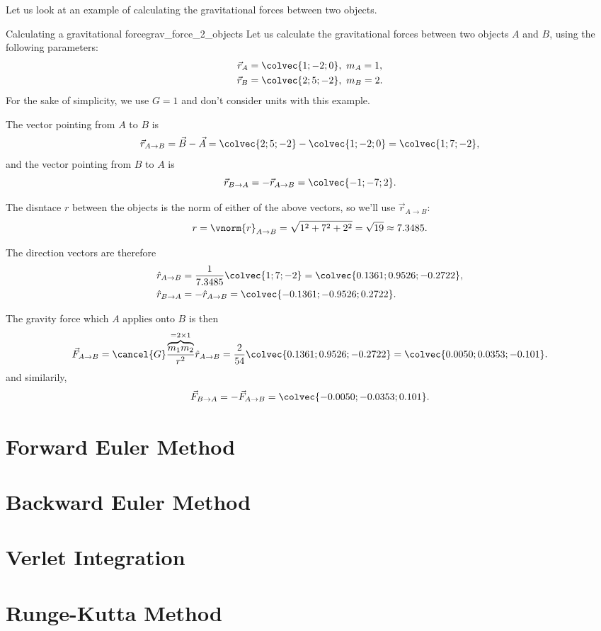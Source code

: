 Let us look at an example of calculating the gravitational forces between two objects.

\begin{example}{Calculating a gravitational force}{grav_force_2_objects}
  Let us calculate the gravitational forces between two objects $A$ and $B$, using the following parameters:
  \begin{align*}
    \vec{r}_{A}&=\colvec{1;-2;0},\ m_{A} = 1,\\
    \vec{r}_{B}&=\colvec{2;5;-2},\ m_{B} = 2.
  \end{align*}
  For the sake of simplicity, we use $G=1$ and don't consider units with this example.

  The vector pointing from $A$ to $B$ is
  \[
    \vec{r}_{A\to B} = \vec{B}-\vec{A} = \colvec{2;5;-2} - \colvec{1;-2;0} = \colvec{1;7;-2},
  \]
  and the vector pointing from $B$ to $A$ is
  \[
    \vec{r}_{B\to A} = -\vec{r}_{A\to B} = \colvec{-1;-7;2}.
  \]

  The disntace $r$ between the objects is the norm of either of the above vectors, so we'll use $\vec{r}_{A\to B}$:
  \[
    r = \vnorm{r}_{A\to B} = \sqrt{1^{2}+7^{2}+2^{2}} = \sqrt{19} \approx 7.3485.
  \]

  The direction vectors are therefore
  \begin{align*}
    \hat{r}_{A\to B} &= \frac{1}{7.3485}\colvec{1;7;-2} = \colvec{0.1361;0.9526;-0.2722},\\
    \hat{r}_{B\to A} &= -\hat{r}_{A\to B} = \colvec{-0.1361;-0.9526;0.2722}.
  \end{align*}

  The gravity force which $A$ applies onto $B$ is then
  \[
    \vec{F}_{A\to B} = \cancel{G}\frac{\overbrace{m_{1}m_{2}}^{=2\times1}}{r^{2}}\hat{r}_{A\to B} = \frac{2}{54}\colvec{0.1361;0.9526;-0.2722} = \colvec{0.0050;0.0353;-0.101}.
  \]
  and similarily,
  \[
    \vec{F}_{B\to A} = -\vec{F}_{A\to B} = \colvec{-0.0050;-0.0353;0.101}.
  \]
\end{example}

\section{Forward Euler Method}

\section{Backward Euler Method}

\section{Verlet Integration}

\section{Runge-Kutta Method}
